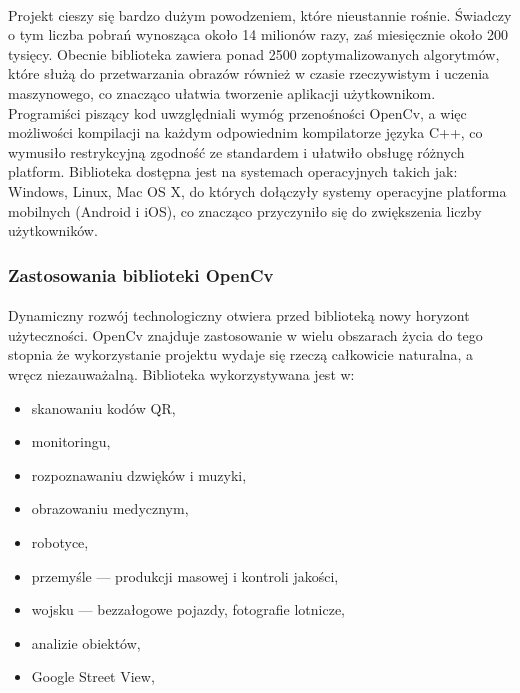 \documentclass[a4paper,12pt]{article}
\begin{document}
			\paragraph{\indent} Projekt cieszy się bardzo dużym powodzeniem, które nieustannie rośnie. Świadczy o tym liczba pobrań 
				wynosząca około 14 milionów razy, zaś miesięcznie około 200 tysięcy. Obecnie biblioteka zawiera ponad 2500 zoptymalizowanych algorytmów, 
				które służą do przetwarzania obrazów również w czasie rzeczywistym i uczenia maszynowego, co znacząco ułatwia tworzenie aplikacji użytkownikom. 
				Programiści piszący kod uwzględniali wymóg przenośności OpenCv, a więc możliwości kompilacji na każdym odpowiednim kompilatorze języka C++, 
				co wymusiło restrykcyjną zgodność ze standardem i ułatwiło obsługę różnych platform. Biblioteka dostępna jest na systemach operacyjnych takich jak: 
				Windows, Linux, Mac OS X, do których dołączyły systemy operacyjne platforma mobilnych (Android i iOS), co znacząco przyczyniło się do zwiększenia liczby użytkowników.

		\subsubsection{Zastosowania biblioteki OpenCv}
			\paragraph{\indent} Dynamiczny rozwój technologiczny otwiera przed biblioteką nowy horyzont użyteczności. 
				OpenCv znajduje zastosowanie w wielu obszarach życia do tego stopnia że wykorzystanie projektu wydaje się rzeczą całkowicie naturalna,
				a wręcz niezauważalną. Biblioteka wykorzystywana jest w:
			
			    \begin{spacing}{1}
			        \begin{itemize}
        				\item skanowaniu kodów QR,
        				\item monitoringu,
        				\item rozpoznawaniu dzwięków i muzyki,
        				\item obrazowaniu medycznym,
        				\item robotyce,	
        				\item przemyśle --- produkcji masowej i kontroli jakości,
        				\item wojsku --- bezzałogowe pojazdy, fotografie lotnicze,
				        \item analizie obiektów,
				        \item Google Street View,
		            \end{itemize}
                \end{spacing}
    
\end{document}
